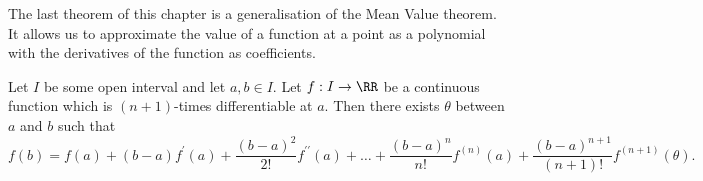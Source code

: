 \documentclass[../real_analysis.tex]{subfiles}
\begin{document}
        The last theorem of this chapter is a generalisation of the Mean Value theorem. It allows us to approximate the value of a function at a point as a polynomial with the derivatives of the function as coefficients.
        \begin{theorem}\label{taylors-thm}
            Let $I$ be some open interval and let $a,b\in I$. Let $f:I\to\RR$ be a continuous function which is $(n+1)$-times differentiable at $a$. Then there exists $\theta$ between $a$ and $b$ such that
            \begin{equation}
                f(b)=f(a)+(b-a)f^\prime(a)+\frac{(b-a)^2}{2!}f^{\prime\prime}(a)+\dots+\frac{(b-a)^n}{n!}f^{(n)}(a)+\frac{(b-a)^{n+1}}{(n+1)!}f^{(n+1)}(\theta).
            \end{equation}
        \end{theorem}
\end{document}

